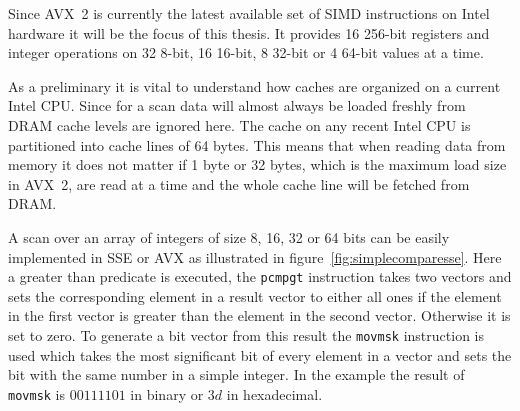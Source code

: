 Since AVX~2 is currently the latest available set of SIMD instructions on Intel
hardware it will be the focus of this thesis. It provides 16 256-bit registers
and integer operations on 32 8-bit, 16 16-bit, 8 32-bit or 4 64-bit values at a
time.

As a preliminary it is vital to understand how caches are organized on a
current Intel CPU. Since for a scan data will almost always be loaded freshly
from DRAM cache levels are ignored here. The cache on any recent Intel CPU is
partitioned into cache lines of 64 bytes. This means that when reading data
from memory it does not matter if 1 byte or 32 bytes, which is the maximum load
size in AVX~2, are read at a time and the whole cache line will be fetched from
DRAM.

A scan over an array of integers of size 8, 16, 32 or 64 bits can be
easily implemented in SSE or AVX as illustrated in
figure~\ref{fig:simplecomparesse}. Here a greater than predicate is executed,
the \texttt{pcmpgt} instruction takes two vectors and sets the corresponding
element in a result vector to either all ones if the element in the first
vector is greater than the element in the second vector. Otherwise it is set to
zero. To generate a bit vector from this result the \texttt{movmsk} instruction
is used which takes the most significant bit of every element in a vector and
sets the bit with the same number in a simple integer. In the example the
result of \texttt{movmsk} is $00111101$ in binary or $3d$ in hexadecimal.

